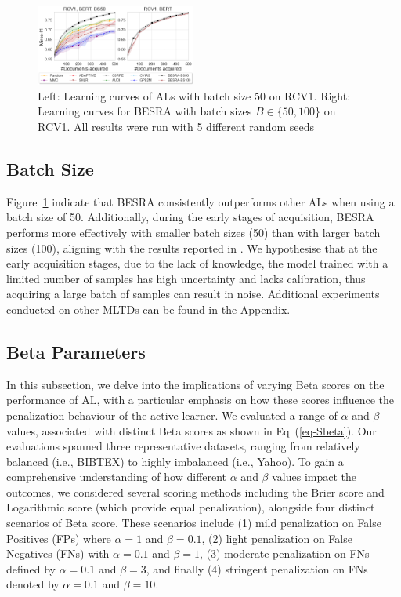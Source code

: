 \documentclass[letterpaper]{article} %
\begin{document}
\begin{figure}[!ht]
\centering
\includegraphics[width=0.47\textwidth]{figures/batchsize_mircof1_2_v1.png}
    \caption{
    Left: Learning curves of ALs with batch size 50 on RCV1. Right: Learning curves for BESRA with batch sizes $B \in  \{50, 100\}$ on RCV1. All results were run with 5 different random seeds}
    \label{fig:batchsize_mircof1_2}
     \vspace{-3mm}
\end{figure}

\subsection{Batch Size}
Figure~\ref{fig:batchsize_mircof1_2} indicate that BESRA consistently outperforms other ALs when using a batch size of 50. 
Additionally, during the early stages of acquisition, BESRA performs more effectively with smaller batch sizes (50) than with larger batch sizes (100), aligning with the results reported in \cite{TanDuBun-IEEEPAMI23, NEURIPS2019_95323660}.
We hypothesise that at the early acquisition stages, due to the lack of knowledge, the model trained with a limited number of samples has high uncertainty and lacks calibration, thus acquiring a large batch of samples can result in noise. Additional experiments conducted on other MLTDs can be found in the Appendix.


\subsection{Beta Parameters}

In this subsection, we delve into the implications of varying Beta scores on the performance of AL, with a particular emphasis on how these scores influence the penalization behaviour of the active learner. 
We evaluated a range of $\alpha$ and $\beta$ values, associated with distinct Beta scores as shown in Eq~(\ref{eq-Sbeta}). 
Our evaluations spanned three representative datasets, ranging from relatively balanced (i.e., BIBTEX) to highly imbalanced (i.e., Yahoo). To gain a comprehensive understanding of how different $\alpha$ and $\beta$ values impact the outcomes, we considered several scoring methods including the Brier score and Logarithmic score (which provide equal penalization), alongside four distinct scenarios of Beta score. These scenarios include (1) mild penalization on False Positives (FPs) where $\alpha=1$ and $\beta=0.1$, (2) light penalization on False Negatives (FNs) with $\alpha=0.1$ and $\beta=1$, (3) moderate penalization on FNs defined by $\alpha=0.1$ and $\beta=3$, and finally (4) stringent penalization on FNs denoted by $\alpha=0.1$ and $\beta=10$.
\end{document}
